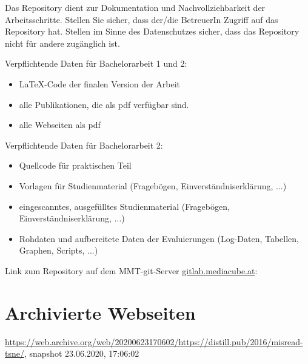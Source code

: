 \begin{appendices}
Das Repository dient zur Dokumentation und Nachvollziehbarkeit der Arbeitsschritte. Stellen Sie sicher, dass der/die BetreuerIn Zugriff auf das Repository hat. Stellen im Sinne des Datenschutzes sicher, dass das Repository nicht für andere zugänglich ist.

Verpflichtende Daten für Bachelorarbeit 1 und 2:

\begin{itemize}
	\item LaTeX-Code der finalen Version der Arbeit
	\item alle Publikationen, die als pdf verfügbar sind.
	\item alle Webseiten als pdf
\end{itemize}

Verpflichtende Daten für Bachelorarbeit 2:
\begin{itemize}
	\item Quellcode für praktischen Teil
	\item Vorlagen für Studienmaterial (Fragebögen, Einverständniserklärung, ...)	
	\item eingescanntes, ausgefülltes Studienmaterial (Fragebögen, Einverständniserklärung, ...)
	\item Rohdaten und aufbereitete Daten der Evaluierungen (Log-Daten, Tabellen, Graphen, Scripts, ...)	
\end{itemize}

Link zum Repository auf dem MMT-git-Server {\url{gitlab.mediacube.at}}:

	


\section{Archivierte Webseiten}
\sloppy
\url{https://web.archive.org/web/20200623170602/https://distill.pub/2016/misread-tsne/}, snapshot 23.06.2020, 17:06:02


\end{appendices}
